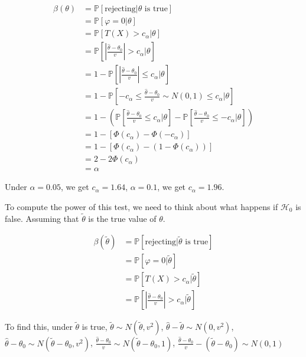 \begin{align*}
    \beta (\theta) & = \mathbb{P} [\text{rejecting} | \theta \text{ is} \text{ true}]\\
    & = \mathbb{P} [\varphi = 0 | \theta]\\
    & = \mathbb{P} [T (X) > c_{\alpha} | \theta]\\
    & = \mathbb{P} \left[ \left| \frac{\hat{\theta} - \theta_0}{v} \right| > c_{\alpha} | \theta \right]\\
    & = 1 - \mathbb{P} \left[ \left| \frac{\hat{\theta} - \theta_0}{v} \right| \leq c_{\alpha} | \theta \right]\\
    & = 1 - \mathbb{P} \left[ - c_{\alpha} \leq \frac{\hat{\theta} - \theta_0}{v} \sim N (0, 1) \leq c_{\alpha} | \theta \right]\\
    & = 1 - \left( \mathbb{P} \left[ \frac{\hat{\theta} - \theta_0}{v} \leq c_{\alpha} | \theta \right] - \mathbb{P} \left[ \frac{\hat{\theta} - \theta_0}{v} \leq - c_{\alpha} | \theta \right] \right)\\
    & = 1 - [\Phi (c_{\alpha}) - \Phi (- c_{\alpha})]\\
    & = 1 - [\Phi (c_{\alpha}) - (1 - \Phi (c_{\alpha}))]\\
    & = 2 - 2 \Phi (c_{\alpha})\\
    & = \alpha
\end{align*}

Under $\alpha = 0.05$, we get $c_{\alpha} = 1.64$, $\alpha = 0.1$, we get
$c_{\alpha} = 1.96$.

To compute the power of this test, we need to think about what happens if
$\mathcal{H}_0$ is false. Assuming that $\tilde{\theta}$ is the true value of
$\theta$.

\begin{align*}
  \beta (\tilde{\theta}) & = \mathbb{P} [\text{rejecting} |
  \tilde{\theta} \text{ is true}]\\
  & = \mathbb{P} [\varphi = 0 | \tilde{\theta}]\\
  & = \mathbb{P} [T (X) > c_{\alpha} | \tilde{\theta}]\\
  & = \mathbb{P} \left[ \left| \frac{\hat{\theta} - \theta_0}{v} \right| >
  c_{\alpha} | \tilde{\theta} \right]
\end{align*}

To find this, under $\tilde{\theta}$ is true, $\tilde{\theta} \sim N
(\tilde{\theta}, v^2)$, $\hat{\theta} - \tilde{\theta} \sim N (0, v^2)$,
$\hat{\theta} - \theta_0 \sim N (\tilde{\theta} - \theta_0, v^2)$,
$\frac{\hat{\theta} - \theta_0}{v} \sim N (\tilde{\theta} - \theta_0, 1)$,
$\frac{\hat{\theta} - \theta_0}{v} - (\tilde{\theta} - \theta_0) \sim N (0,
1)$

